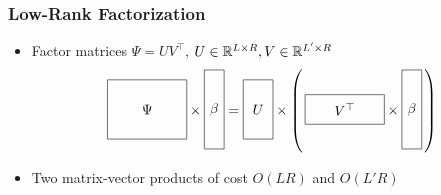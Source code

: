 \documentclass{beamer}
\begin{document}
\begin{frame}
\frametitle{Low-Rank Factorization}
\begin{itemize}
\item Factor matrices $\Psi=UV^\top$,
$U\in\mathbb{R}^{L \times R},V\in\mathbb{R}^{L'\times R}$
\[
\vcenter{\hbox{\begin{tikzpicture}[baseline=-0.5ex]
    \draw (0,0) rectangle (2,1.5) node[pos=.5] {$\Psi$};
\end{tikzpicture}}}
\times
\vcenter{\hbox{\begin{tikzpicture}[baseline=-0.5ex]
    \draw (0,0) rectangle (.5,2) node[pos=.5] {$\beta$};
\end{tikzpicture}}}
=
\vcenter{\hbox{\begin{tikzpicture}[baseline=-0.5ex]
    \draw (0,0) rectangle (.75,1.5) node[pos=.5] {$U$};
\end{tikzpicture}}}
\times
\left(\,
\vcenter{\hbox{\begin{tikzpicture}[baseline=-0.5ex]
    \draw (0,0) rectangle (2,.75) node[pos=.5] {$V^\top$};
\end{tikzpicture}}}
\times
\vcenter{\hbox{\begin{tikzpicture}[baseline=-0.5ex]
    \draw (0,0) rectangle (.5,2) node[pos=.5] {$\beta$};
\end{tikzpicture}}}
\,\right)
\]
\item Two matrix-vector products of cost $O(LR)$ and $O(L'R)$
\end{itemize}
\end{frame}
\end{document}
